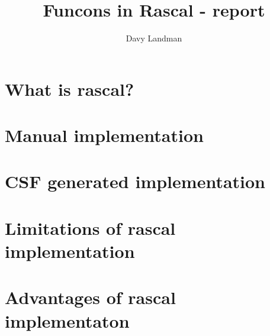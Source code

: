 \documentclass[a4paper, 10pt, oneside, notitlepage]{article}
\title{Funcons in Rascal - report}
\author{Davy Landman}
\begin{document}
\maketitle

\section{What is rascal?}

\section{Manual implementation}

\section{CSF generated implementation}

\section{Limitations of rascal implementation}

\section{Advantages of rascal implementaton}
\end{document}
